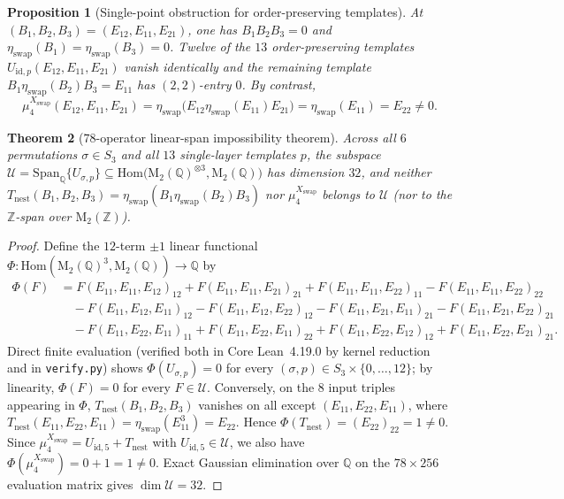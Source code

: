 \documentclass[11pt,a4paper]{article}
\newtheorem{theorem}{Theorem}[section]
\newtheorem{proposition}[theorem]{Proposition}
\theoremstyle{definition}
\newcommand{\Mat}{\mathrm{M}}
\newcommand{\id}{\mathrm{id}}
\begin{document}
\begin{proposition}[Single-point obstruction for order-preserving templates]\label{prop:single-point}
At $(B_1, B_2, B_3) = (E_{12}, E_{11}, E_{21})$, one has $B_1 B_2 B_3 = 0$ and $\eta_{\mathrm{swap}}(B_1) = \eta_{\mathrm{swap}}(B_3) = 0$. Twelve of the $13$ order-preserving templates $U_{\id, p}(E_{12}, E_{11}, E_{21})$ vanish identically and the remaining template $B_1 \eta_{\mathrm{swap}}(B_2) B_3 = E_{11}$ has $(2,2)$-entry $0$. By contrast,
\[
\mu_4^{X_{\mathrm{swap}}}(E_{12}, E_{11}, E_{21}) = \eta_{\mathrm{swap}}\bigl(E_{12} \eta_{\mathrm{swap}}(E_{11}) E_{21}\bigr) = \eta_{\mathrm{swap}}(E_{11}) = E_{22} \neq 0.
\]
\end{proposition}

\begin{theorem}[$78$-operator linear-span impossibility theorem]\label{thm:nogo-78}
Across all $6$ permutations $\sigma \in S_3$ and all $13$ single-layer templates $p$, the subspace $\mathcal{U} = \mathrm{Span}_{\mathbb{Q}}\{U_{\sigma, p}\} \subseteq \mathrm{Hom}\bigl(\Mat_2(\mathbb{Q})^{\otimes 3}, \Mat_2(\mathbb{Q})\bigr)$ has dimension $32$, and neither $T_{\mathrm{nest}}(B_1, B_2, B_3) = \eta_{\mathrm{swap}}(B_1 \eta_{\mathrm{swap}}(B_2) B_3)$ nor $\mu_4^{X_{\mathrm{swap}}}$ belongs to $\mathcal{U}$ (nor to the $\mathbb{Z}$-span over $\Mat_2(\mathbb{Z})$).
\end{theorem}
\begin{proof}
Define the $12$-term $\pm 1$ linear functional $\Phi \colon \mathrm{Hom}(\Mat_2(\mathbb{Q})^3, \Mat_2(\mathbb{Q})) \to \mathbb{Q}$ by
\begin{align*}
\Phi(F) &= F(E_{11}, E_{11}, E_{12})_{12} + F(E_{11}, E_{11}, E_{21})_{21} + F(E_{11}, E_{11}, E_{22})_{11} - F(E_{11}, E_{11}, E_{22})_{22} \\
&\quad - F(E_{11}, E_{12}, E_{11})_{12} - F(E_{11}, E_{12}, E_{22})_{12} - F(E_{11}, E_{21}, E_{11})_{21} - F(E_{11}, E_{21}, E_{22})_{21} \\
&\quad - F(E_{11}, E_{22}, E_{11})_{11} + F(E_{11}, E_{22}, E_{11})_{22} + F(E_{11}, E_{22}, E_{12})_{12} + F(E_{11}, E_{22}, E_{21})_{21}.
\end{align*}
Direct finite evaluation (verified both in Core Lean~4.19.0 by kernel reduction and in \texttt{verify.py}) shows $\Phi(U_{\sigma, p}) = 0$ for every $(\sigma, p) \in S_3 \times \{0, \dots, 12\}$; by linearity, $\Phi(F) = 0$ for every $F \in \mathcal{U}$. Conversely, on the $8$ input triples appearing in $\Phi$, $T_{\mathrm{nest}}(B_1, B_2, B_3)$ vanishes on all except $(E_{11}, E_{22}, E_{11})$, where $T_{\mathrm{nest}}(E_{11}, E_{22}, E_{11}) = \eta_{\mathrm{swap}}(E_{11}^3) = E_{22}$. Hence $\Phi(T_{\mathrm{nest}}) = (E_{22})_{22} = 1 \neq 0$. Since $\mu_4^{X_{\mathrm{swap}}} = U_{\id, 5} + T_{\mathrm{nest}}$ with $U_{\id, 5} \in \mathcal{U}$, we also have $\Phi(\mu_4^{X_{\mathrm{swap}}}) = 0 + 1 = 1 \neq 0$. Exact Gaussian elimination over $\mathbb{Q}$ on the $78 \times 256$ evaluation matrix gives $\dim \mathcal{U} = 32$.
\end{proof}
\end{document}
